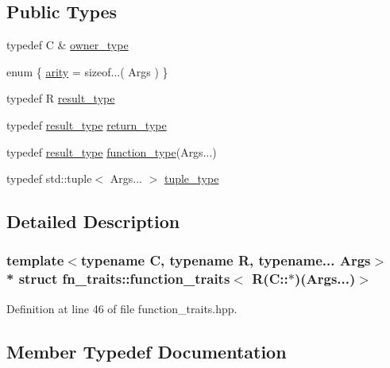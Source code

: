 \subsection*{Public Types}
\begin{DoxyCompactItemize}
\item 
typedef C \& \hyperlink{structfn__traits_1_1function__traits_3_01_r_07_c_1_1_5_08_07_args_8_8_8_08_4_aa6e7fe5af891f86ccb332181422c219d}{owner\+\_\+type}
\item 
enum \{ \hyperlink{structfn__traits_1_1function__traits_3_01_r_07_args_8_8_8_08_4_aafde9521d9646c97b984646d8273dd3ba2f612b5524050ab8d6ab3d54d52dbbb0}{arity} = sizeof...( Args )
 \}
\item 
typedef R \hyperlink{structfn__traits_1_1function__traits_3_01_r_07_args_8_8_8_08_4_a1b509243ed1b4707465625de10e6c6bb}{result\+\_\+type}
\item 
typedef \hyperlink{structfn__traits_1_1function__traits_3_01_r_07_args_8_8_8_08_4_a1b509243ed1b4707465625de10e6c6bb}{result\+\_\+type} \hyperlink{structfn__traits_1_1function__traits_3_01_r_07_args_8_8_8_08_4_adf6a35a9b703dfb4778e59f132e00a9b}{return\+\_\+type}
\item 
typedef \hyperlink{structfn__traits_1_1function__traits_3_01_r_07_args_8_8_8_08_4_a1b509243ed1b4707465625de10e6c6bb}{result\+\_\+type} \hyperlink{structfn__traits_1_1function__traits_3_01_r_07_args_8_8_8_08_4_a85e5883a1c8050fe442c1072386b2d11}{function\+\_\+type}(Args...)
\item 
typedef std\+::tuple$<$ Args... $>$ \hyperlink{structfn__traits_1_1function__traits_3_01_r_07_args_8_8_8_08_4_a9b60ae8c79e52addf352e4ae7c8077b4}{tuple\+\_\+type}
\end{DoxyCompactItemize}


\subsection{Detailed Description}
\subsubsection*{template$<$typename C, typename R, typename... Args$>$\\*
struct fn\+\_\+traits\+::function\+\_\+traits$<$ R(\+C\+::$\ast$)(\+Args...)$>$}



Definition at line 46 of file function\+\_\+traits.\+hpp.



\subsection{Member Typedef Documentation}
